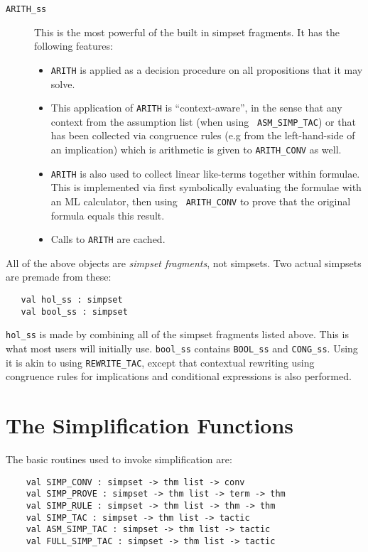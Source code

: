 \begin{description}
\item[{\tt ARITH\_ss}] This is the most powerful of the built in
  simpset fragments.  It has the following features:
  \begin{itemize}
  \item {\tt ARITH} is applied as a decision procedure
    on all propositions that it may solve.
  \item This application of {\tt ARITH} is ``context-aware'', in the
    sense that any context from the assumption list (when using {\tt
      ASM\_SIMP\_TAC}) or that has been collected via congruence rules
    (e.g from the left-hand-side of an implication) which is
    arithmetic is given to {\tt ARITH\_CONV} as well.
  \item {\tt ARITH} is also used to collect linear like-terms together
    within formulae.  This is implemented via first symbolically
    evaluating the formulae with an ML calculator, then using {\tt
      ARITH\_CONV} to prove that the original formula equals this
    result.
  \item Calls to {\tt ARITH} are cached.
  \end{itemize}
\end{description}


All of the above objects are {\em simpset fragments}, not simpsets.
Two actual simpsets are premade from these:
\begin{boxed} \begin{verbatim}
   val hol_ss : simpset
   val bool_ss : simpset
\end{verbatim} \end{boxed}
{\tt hol\_ss} is made by combining all of the simpset fragments listed above.  This
is what most users will initially use.
{\tt bool\_ss} contains {\tt BOOL\_ss} and {\tt CONG\_ss}.  Using
it is akin to using {\tt REWRITE\_TAC}, except that contextual
rewriting using congruence rules for implications and conditional
expressions is also performed.


\section{The Simplification Functions}

The basic routines used to invoke simplification are:
\begin{boxed} \begin{verbatim}
    val SIMP_CONV : simpset -> thm list -> conv
    val SIMP_PROVE : simpset -> thm list -> term -> thm
    val SIMP_RULE : simpset -> thm list -> thm -> thm
    val SIMP_TAC : simpset -> thm list -> tactic
    val ASM_SIMP_TAC : simpset -> thm list -> tactic
    val FULL_SIMP_TAC : simpset -> thm list -> tactic
\end{verbatim} \end{boxed}

